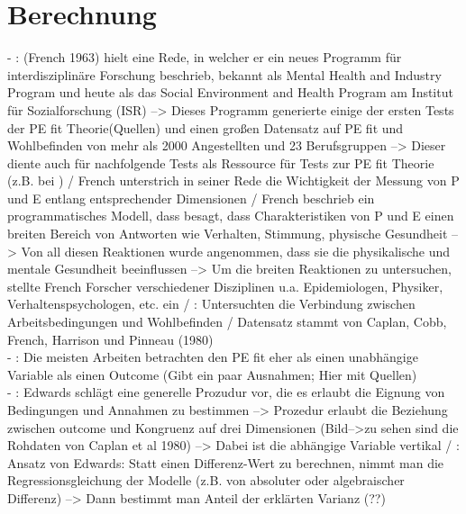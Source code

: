 \section{Berechnung}
\label{ch:personEnvironmentFit:berechnung}
- \cite[S. 1f.]{caplan:1993}: (French 1963) hielt eine Rede, in welcher er ein neues Programm für interdisziplinäre Forschung beschrieb, bekannt als Mental Health and Industry Program und heute als das Social Environment and Health Program am Institut für Sozialforschung (ISR) --> Dieses Programm generierte einige der ersten Tests der PE fit Theorie(Quellen) und einen großen Datensatz auf PE fit und Wohlbefinden von mehr als 2000 Angestellten und 23 Berufsgruppen --> Dieser diente auch für nachfolgende Tests als Ressource für Tests zur PE fit Theorie (z.B. bei \textcite{edwards:1993}) / French unterstrich in seiner Rede die Wichtigkeit der Messung von P und E entlang entsprechender Dimensionen / French beschrieb ein programmatisches Modell, dass besagt, dass Charakteristiken von P und E einen breiten Bereich von Antworten wie Verhalten, Stimmung, physische Gesundheit --> Von all diesen Reaktionen wurde angenommen, dass sie die physikalische und mentale Gesundheit beeinflussen --> Um die breiten Reaktionen zu untersuchen, stellte French Forscher verschiedener Disziplinen u.a. Epidemiologen, Physiker, Verhaltenspsychologen, etc. ein / \cite[S. 4]{caplan:1993}: Untersuchten die Verbindung zwischen Arbeitsbedingungen und Wohlbefinden / Datensatz stammt von Caplan,  Cobb,  French,  Harrison und Pinneau (1980) \\- \cite[S. 11]{caplan:1993}: Die meisten Arbeiten betrachten den PE fit eher als einen unabhängige Variable als einen Outcome (Gibt ein paar Ausnahmen; Hier mit Quellen) \\
- \cite[S. 15f.]{caplan:1993}: Edwards schlägt eine generelle Prozudur vor, die es erlaubt die Eignung von Bedingungen und Annahmen zu bestimmen --> Prozedur erlaubt die Beziehung zwischen outcome und Kongruenz auf drei Dimensionen (Bild-->zu sehen sind die Rohdaten von Caplan et al 1980) --> Dabei ist die abhängige Variable vertikal / \cite[S. 16]{caplan:1993}: Ansatz von Edwards: Statt einen Differenz-Wert zu berechnen, nimmt man die Regressionsgleichung der Modelle (z.B. von absoluter oder algebraischer Differenz) --> Dann bestimmt man Anteil der erklärten Varianz (??)\\
